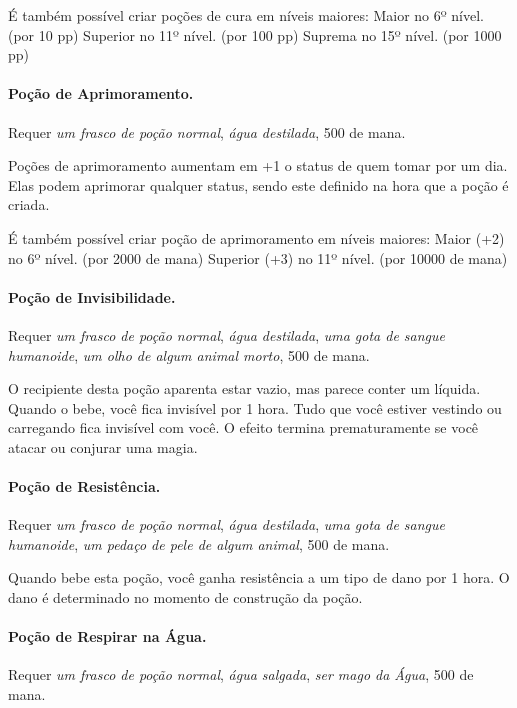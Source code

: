 \begin{multicols}{2}
É também possível criar poções de cura em níveis maiores: \nl
Maior no 6º nível. (por 10 pp) \nl
Superior no 11º nível. (por 100 pp) \nl
Suprema no 15º nível. (por 1000 pp) \nl

\paragraph{Poção de Aprimoramento.}

Requer \textit{um frasco de poção normal}, \textit{água destilada}, 500 de mana.

Poções de aprimoramento aumentam em +1 o status de quem tomar por um dia. Elas
podem aprimorar qualquer status, sendo este definido na hora que a poção é
criada.

É também possível criar poção de aprimoramento em níveis maiores: \nl
Maior (+2) no 6º nível. (por 2000 de mana) \nl
Superior (+3) no 11º nível. (por 10000 de mana) \nl

\paragraph{Poção de Invisibilidade.}

Requer \textit{um frasco de poção normal}, \textit{água destilada}, \textit{uma
gota de sangue humanoide}, \textit{um olho de algum animal morto}, 500 de mana.

O recipiente desta poção aparenta estar vazio, mas parece conter um líquida.
Quando o bebe, você fica invisível por 1 hora. Tudo que você estiver vestindo ou
carregando fica invisível com você. O efeito termina prematuramente se você
atacar ou conjurar uma magia.

\paragraph{Poção de Resistência.}

Requer \textit{um frasco de poção normal}, \textit{água destilada}, \textit{uma
gota de sangue humanoide}, \textit{um pedaço de pele de algum animal}, 500 de
mana.

Quando bebe esta poção, você ganha resistência a um tipo de dano por 1 hora. O
dano é determinado no momento de construção da poção.

\paragraph{Poção de Respirar na Água.}

Requer \textit{um frasco de poção normal}, \textit{água salgada}, \textit{ser
mago da Água}, 500 de mana.


\end{multicols}
